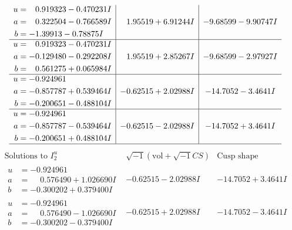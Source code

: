 \documentclass[1p]{elsarticle_modified}
\theoremstyle{definition}
\newcommand{\I}{\sqrt{-1}}
\begin{document}
$$\begin{array}{c|c|c}
\begin{aligned}
u &= \phantom{-}0.919323 - 0.470231 I \\
a &= \phantom{-}0.322504 - 0.766589 I \\
b &= -1.39913 - 0.78875 I\end{aligned}
 & \phantom{-}1.95519 + 6.91244 I & -9.68599 - 9.90747 I \\ \hline\begin{aligned}
u &= \phantom{-}0.919323 - 0.470231 I \\
a &= -0.129480 - 0.292208 I \\
b &= \phantom{-}0.561275 + 0.065984 I\end{aligned}
 & \phantom{-}1.95519 + 2.85267 I & -9.68599 - 2.97927 I \\ \hline\begin{aligned}
u &= -0.924961\phantom{ +0.000000I} \\
a &= -0.857787 + 0.539464 I \\
b &= -0.200651 - 0.488104 I\end{aligned}
 & -0.62515 + 2.02988 I & -14.7052 - 3.4641 I \\ \hline\begin{aligned}
u &= -0.924961\phantom{ +0.000000I} \\
a &= -0.857787 - 0.539464 I \\
b &= -0.200651 + 0.488104 I\end{aligned}
 & -0.62515 - 2.02988 I & -14.7052 + 3.4641 I\\
 \hline 
 \end{array}$$\newpage$$\begin{array}{c|c|c}  
\text{Solutions to }I^u_{2}& \I (\text{vol} + \sqrt{-1}CS) & \text{Cusp shape}\\
 \hline 
\begin{aligned}
u &= -0.924961\phantom{ +0.000000I} \\
a &= \phantom{-}0.576490 + 1.026690 I \\
b &= -0.300202 + 0.379400 I\end{aligned}
 & -0.62515 - 2.02988 I & -14.7052 + 3.4641 I \\ \hline\begin{aligned}
u &= -0.924961\phantom{ +0.000000I} \\
a &= \phantom{-}0.576490 - 1.026690 I \\
b &= -0.300202 - 0.379400 I\end{aligned}
 & -0.62515 + 2.02988 I & -14.7052 - 3.4641 I \\ \hline\begin{aligned}

\end{aligned}
\end{array}$$
\end{document}
